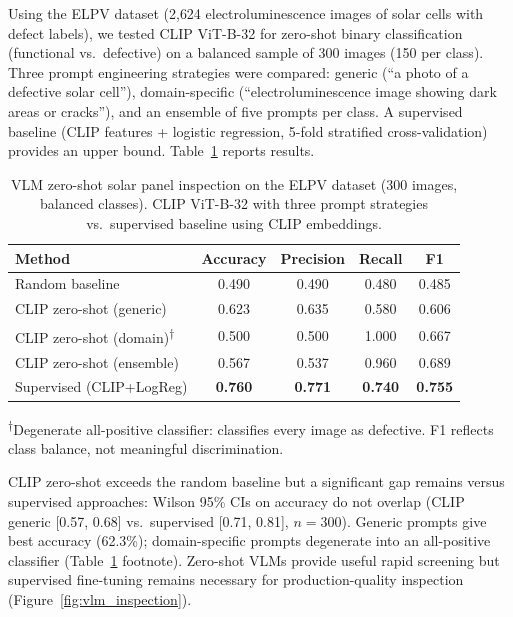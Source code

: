 \documentclass[preprint,12pt]{elsarticle}
\begin{document}
Using the ELPV dataset \cite{deitsch2019elpv} (2{,}624 electroluminescence images of solar cells with defect labels), we tested CLIP ViT-B-32 \cite{radford2021learning} for zero-shot binary classification (functional vs.\ defective) on a balanced sample of 300 images (150 per class). Three prompt engineering strategies were compared: generic (``a photo of a defective solar cell''), domain-specific (``electroluminescence image showing dark areas or cracks''), and an ensemble of five prompts per class. A supervised baseline (CLIP features + logistic regression, 5-fold stratified cross-validation) provides an upper bound. Table~\ref{tab:vlm_benchmark} reports results.

\begin{table}[htbp]
\centering
\caption{VLM zero-shot solar panel inspection on the ELPV dataset (300 images, balanced classes). CLIP ViT-B-32 with three prompt strategies vs.\ supervised baseline using CLIP embeddings.}
\label{tab:vlm_benchmark}
\small
\begin{tabular}{@{}lcccc@{}}
\toprule
\textbf{Method} & \textbf{Accuracy} & \textbf{Precision} & \textbf{Recall} & \textbf{F1} \\
\midrule
Random baseline & 0.490 & 0.490 & 0.480 & 0.485 \\
CLIP zero-shot (generic) & 0.623 & 0.635 & 0.580 & 0.606 \\
CLIP zero-shot (domain)\textsuperscript{$\dagger$} & 0.500 & 0.500 & 1.000 & 0.667 \\
CLIP zero-shot (ensemble) & 0.567 & 0.537 & 0.960 & 0.689 \\
\midrule
Supervised (CLIP+LogReg) & \textbf{0.760} & \textbf{0.771} & \textbf{0.740} & \textbf{0.755} \\
\bottomrule
\end{tabular}
\vspace{2pt}
\raggedright\footnotesize\textsuperscript{$\dagger$}Degenerate all-positive classifier: classifies every image as defective. F1 reflects class balance, not meaningful discrimination.
\end{table}

CLIP zero-shot exceeds the random baseline but a significant gap remains versus supervised approaches: Wilson 95\% CIs on accuracy do not overlap (CLIP generic [0.57, 0.68] vs.\ supervised [0.71, 0.81], $n=300$). Generic prompts give best accuracy (62.3\%); domain-specific prompts degenerate into an all-positive classifier (Table~\ref{tab:vlm_benchmark} footnote). Zero-shot VLMs provide useful rapid screening but supervised fine-tuning remains necessary for production-quality inspection (Figure~\ref{fig:vlm_inspection}).
\end{document}
